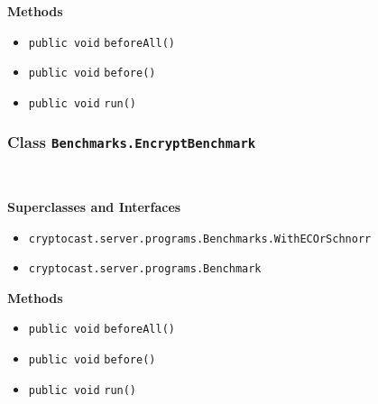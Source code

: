 \textbf{\sffamily Methods}
\begin{itemize}
\item \lstinline|public void| \lstinline|beforeAll|\lstinline|()| \\[-0.6em]




\item \lstinline|public void| \lstinline|before|\lstinline|()| \\[-0.6em]




\item \lstinline|public void| \lstinline|run|\lstinline|()| \\[-0.6em]




\end{itemize}

\subsubsection{Class \lstinline|Benchmarks.EncryptBenchmark|}
 \\
\noindent\begin{minipage}[t]{5cm}
\vspace{0.3em}
\hspace*{2em}
\vspace{0.3em}
\end{minipage}



\textbf{\sffamily Superclasses and Interfaces}
\begin{itemize}
\item \lstinline|cryptocast.server.programs.Benchmarks.WithECOrSchnorr|
\item \lstinline|cryptocast.server.programs.Benchmark|
\end{itemize}



\textbf{\sffamily Methods}
\begin{itemize}
\item \lstinline|public void| \lstinline|beforeAll|\lstinline|()| \\[-0.6em]




\item \lstinline|public void| \lstinline|before|\lstinline|()| \\[-0.6em]




\item \lstinline|public void| \lstinline|run|\lstinline|()| \\[-0.6em]




\end{itemize}

